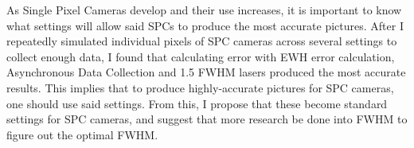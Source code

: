 \documentclass{beamer}
\begin{document}
\begin{frame}
\end{frame}

\begin{frame}
  As Single Pixel Cameras develop and their use increases, it is important to know what settings will allow said SPCs to produce the most accurate pictures. After I repeatedly simulated  individual pixels of SPC cameras across several settings to collect enough data, I found that calculating error with EWH error calculation, Asynchronous Data Collection and 1.5 FWHM lasers produced the most accurate results. This implies that to produce highly-accurate pictures for SPC cameras, one should use said settings. From this, I propose that these become standard settings for SPC cameras, and suggest that more research be done into FWHM to figure out the optimal FWHM.
\end{frame}

\begin{frame}
\end{frame}

\begin{frame}
  \printbibliography
  
\end{frame}
\end{document}

